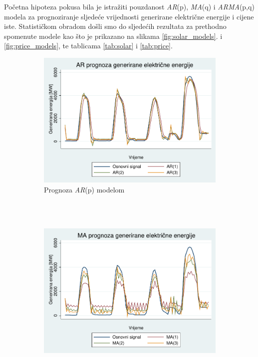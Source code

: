 \documentclass[a4paper,12pt,oneside]{memoir}
\begin{document}
        Početna hipoteza pokusa bila je istražiti pouzdanost \textit{AR}(p), \textit{MA}(q) i \textit{ARMA}(p,q) modela za prognoziranje sljedeće vrijednosti generirane električne energije i cijene iste. Statističkom obradom došli smo do sljedećih rezultata za prethodno spomenute modele kao što je prikazano na slikama \ref{fig:solar_models}. i \ref{fig:price_models}, te tablicama \ref{tab:solar} i \ref{tab:price}.

        \begin{figure}[H]
            \centering
            \begin{subfigure}[b] {0.50\linewidth}
                \centering
                \includegraphics[width=\textwidth]{graphs/solar_graph_ar.pdf}
                \caption{Prognoza \textit{AR}(p) modelom}
                \label{fig:solar_graph_ar}
            \end{subfigure}
            \\~\\
            \begin{subfigure}[b] {0.50\linewidth}
                \centering
                \includegraphics[width=\textwidth]{graphs/solar_graph_ma.pdf}

\end{subfigure}
\end{figure}
\end{document}
